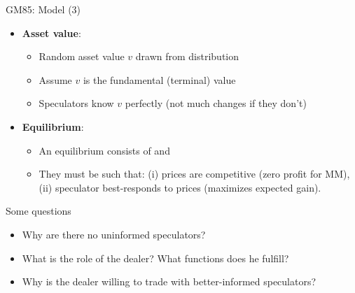 \documentclass[english,10pt
,aspectratio=169
]{beamer}
\begin{document}
\begin{frame}{GM85: Model (3)}
\begin{itemize}
	\item \textbf{Asset value}:
	\begin{itemize}
		\item Random asset value $v$ drawn from distribution
		\item Assume $v$ is the fundamental (terminal) value
		\item Speculators know $v$ perfectly (not much changes if they don't)
	\end{itemize}
	\item \textbf{Equilibrium}:
	\begin{itemize}
		\item An equilibrium consists of  and 
		\item They must be such that: (i) prices are competitive (zero profit for MM), (ii) speculator best-responds to prices (maximizes expected gain).
	\end{itemize}
\end{itemize}
\end{frame}


\begin{frame}{Some questions}
\begin{itemize}[<+->]
	\item Why are there no uninformed speculators?
	\item What is the role of the dealer? What functions does he fulfill?
	\item Why is the dealer willing to trade with better-informed speculators?
\end{itemize}
\end{frame}
\end{document}
